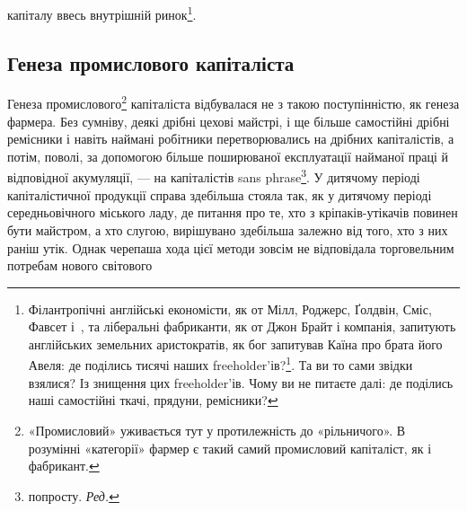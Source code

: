 капіталу ввесь внутрішній ринок\footnote{
Філантропічні англійські економісти, як от Мілл, Роджерс, Ґолдвін,
Сміс, Фавсет і~, та ліберальні фабриканти, як от Джон Брайт
і компанія, запитують англійських земельних аристократів, як бог
запитував Каїна про брата його Авеля: де поділись тисячі наших freeholder’ів?\footnote*{
самостійних селян. \emph{Ред.}
}.
Та ви то сами звідки взялися? Із знищення цих freeholder’ів.
Чому ви не питаєте далі: де поділись наші самостійні ткачі, прядуни,
ремісники?
}.

\subsection{Генеза промислового капіталіста}

Генеза промислового\footnote{
«Промисловий» уживається тут у протилежність до «рільничого».
В розумінні «категорії» фармер є такий самий промисловий капіталіст,
як і фабрикант.
} капіталіста відбувалася не з такою
поступінністю, як генеза фармера. Без сумніву, деякі дрібні
цехові майстрі, і ще більше самостійні дрібні ремісники і навіть
наймані робітники перетворювались на дрібних капіталістів,
а потім, поволі, за допомогою більше поширюваної експлуатації
найманої праці й відповідної акумуляції, — на капіталістів sans
phrase\footnote*{
попросту. \emph{Ред.}
}. У дитячому періоді капіталістичної продукції справа
здебільша стояла так, як у дитячому періоді середньовічного
міського ладу, де питання про те, хто з кріпаків-утікачів повинен
бути майстром, а хто слугою, вирішувано здебільша залежно
від того, хто з них раніш утік. Однак черепаша хода цієї методи
зовсім не відповідала торговельним потребам нового світового
\parbreak{}  %
